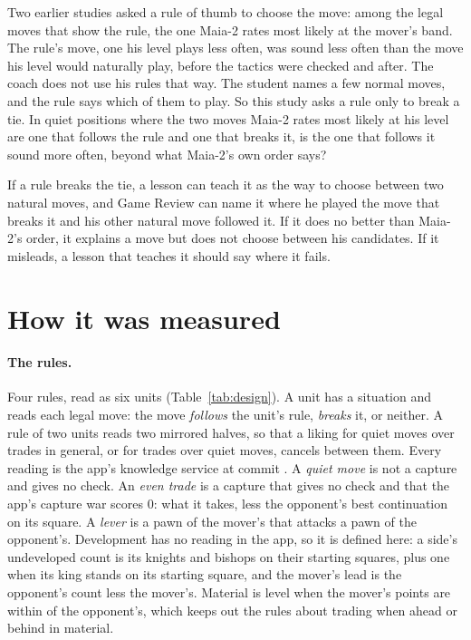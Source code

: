 \documentclass[11pt]{article}
\begin{document}
Two earlier studies asked a rule of thumb to choose the move: among the legal moves that show the
rule, the one Maia-2 rates most likely at the mover's band. The rule's move, one his level plays
less often, was sound less often than the move his level would naturally play, before the tactics
were checked and after. The coach does not use his rules that way. The student names a few normal
moves, and the rule says which of them to play. So this study asks a rule only to break a tie. In
quiet positions where the two moves Maia-2 rates most likely at his level are one that follows the
rule and one that breaks it, is the one that follows it sound more often, beyond what Maia-2's own
order says?

If a rule breaks the tie, a lesson can teach it as the way to choose between two natural moves, and
Game Review can name it where he played the move that breaks it and his other natural move followed
it. If it does no better than Maia-2's order, it explains a move but does not choose between his
candidates. If it misleads, a lesson that teaches it should say where it fails.

\section{How it was measured}

\paragraph{The rules.} Four rules, read as six units (Table~\ref{tab:design}). A unit has a
situation and reads each legal move: the move \emph{follows} the unit's rule, \emph{breaks} it, or
neither. A rule of two units reads two mirrored halves, so that a liking for quiet moves over
trades in general, or for trades over quiet moves, cancels between them. Every reading is the app's
knowledge service at commit \texttt{\AppCommit}. A \emph{quiet move} is not a capture and gives no
check. An \emph{even trade} is a capture that gives no check and that the app's capture war scores
0: what it takes, less the opponent's best continuation on its square. A \emph{lever} is a pawn of
the mover's that attacks a pawn of the opponent's. Development has no reading in the app, so it is
defined here: a side's undeveloped count is its knights and bishops on their starting squares, plus
one when its king stands on its starting square, and the mover's lead is the opponent's count less
the mover's. Material is level when the mover's points are within \LevelWithin{} of the
opponent's, which keeps out the rules about trading when ahead or behind in material.
\end{document}
